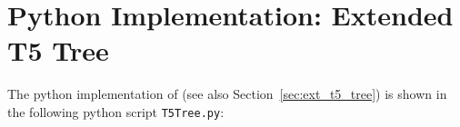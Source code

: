 \chapter{Python Implementation: Extended T5 Tree}
\label{cha:appendix_t5_tree_implementation}
The python implementation of \textit{\extree} (see also Section~\ref{sec:ext_t5_tree}) is shown in the following python script \texttt{T5Tree.py}:

% 

\inputminted[breaklines,linenos]{python}{scripts/T5Tree.py}
